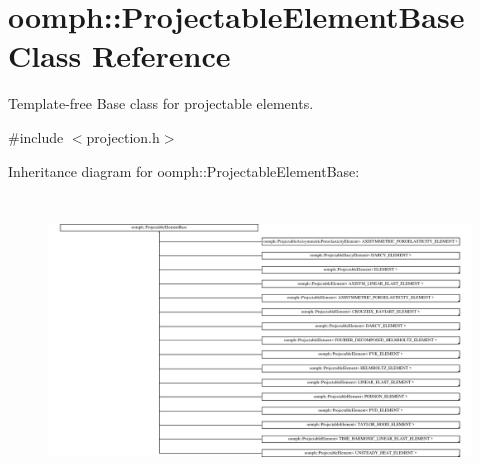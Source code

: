 \hypertarget{classoomph_1_1ProjectableElementBase}{}\section{oomph\+:\+:Projectable\+Element\+Base Class Reference}
\label{classoomph_1_1ProjectableElementBase}


Template-\/free Base class for projectable elements.  




{\ttfamily \#include $<$projection.\+h$>$}

Inheritance diagram for oomph\+:\+:Projectable\+Element\+Base\+:\begin{figure}[H]
\begin{center}
\leavevmode
\includegraphics[height=7.702266cm]{classoomph_1_1ProjectableElementBase}
\end{center}
\end{figure}
